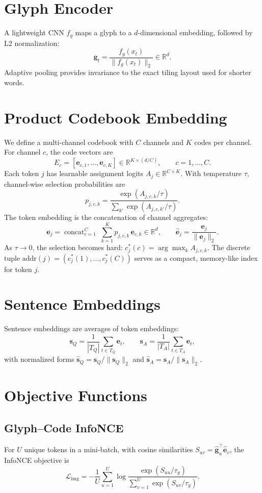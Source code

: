 \documentclass[11pt]{article}
\begin{document}
\section{Glyph Encoder}
A lightweight CNN \( f_g \) maps a glyph to a \(d\)-dimensional embedding, followed by L2 normalization:
\[
  \mathbf{g}_t = \frac{f_g(x_t)}{\lVert f_g(x_t)\rVert_2} \in \mathbb{R}^d.
\]
Adaptive pooling provides invariance to the exact tiling layout used for shorter words.

\section{Product Codebook Embedding}
We define a multi-channel codebook with \(C\) channels and \(K\) codes per channel. For channel \(c\), the code vectors are
\[
  E_c = [\mathbf{e}_{c,1},\ldots,\mathbf{e}_{c,K}] \in \mathbb{R}^{K\times (d/C)}, \qquad c=1,\ldots,C.
\]
Each token \(j\) has learnable assignment logits \(A_j \in \mathbb{R}^{C\times K}\). With temperature \(\tau\), channel-wise selection probabilities are
\[
  p_{j,c,k} = \frac{\exp(A_{j,c,k}/\tau)}{\sum\limits_{k'} \exp(A_{j,c,k'}/\tau)}.
\]
The token embedding is the concatenation of channel aggregates:
\[
  \mathbf{e}_j = \operatorname{concat}_{c=1}^{C} \; \sum_{k=1}^{K} p_{j,c,k} \, \mathbf{e}_{c,k} \in \mathbb{R}^d, \qquad \hat{\mathbf{e}}_j = \frac{\mathbf{e}_j}{\lVert \mathbf{e}_j \rVert_2}.
\]
As \(\tau \to 0\), the selection becomes hard: \(c_j^*(c) = \arg\max_k A_{j,c,k}\). The discrete tuple \(\text{addr}(j) = (c_j^*(1),\ldots,c_j^*(C))\) serves as a compact, memory-like index for token \(j\).

\section{Sentence Embeddings}
Sentence embeddings are averages of token embeddings:
\[
  \mathbf{s}_Q = \frac{1}{|T_Q|} \sum_{t\in T_Q} \mathbf{e}_t, \qquad \mathbf{s}_A = \frac{1}{|T_A|} \sum_{t\in T_A} \mathbf{e}_t,
\]
with normalized forms \(\hat{\mathbf{s}}_Q = \mathbf{s}_Q/\lVert\mathbf{s}_Q\rVert_2\) and \(\hat{\mathbf{s}}_A = \mathbf{s}_A/\lVert\mathbf{s}_A\rVert_2\).

\section{Objective Functions}
\subsection{Glyph--Code InfoNCE}
For \(U\) unique tokens in a mini-batch, with cosine similarities \(S_{uv} = \hat{\mathbf{g}}_u^\top \hat{\mathbf{e}}_v\), the InfoNCE objective is
\[
  \mathcal{L}_{\text{img}} = -\frac{1}{U} \sum_{u=1}^{U} \log \frac{\exp(S_{uu}/\tau_g)}{\sum_{v=1}^{U} \exp(S_{uv}/\tau_g)}.
\]
\end{document}
